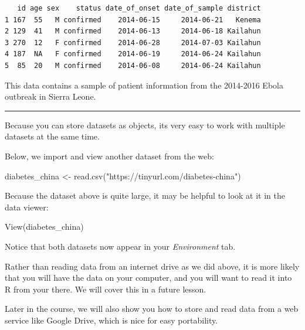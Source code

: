\documentclass[
  letterpaper,
  DIV=11,
  numbers=noendperiod]{scrreprt}
\newenvironment{Shaded}{\begin{snugshade}}{\end{snugshade}}
\newcommand{\FunctionTok}[1]{\textcolor[rgb]{0.28,0.35,0.67}{#1}}
\newcommand{\NormalTok}[1]{\textcolor[rgb]{0.00,0.23,0.31}{#1}}
\newcommand{\OtherTok}[1]{\textcolor[rgb]{0.00,0.23,0.31}{#1}}
\newcommand{\StringTok}[1]{\textcolor[rgb]{0.13,0.47,0.30}{#1}}
\begin{document}
\begin{verbatim}
   id age sex    status date_of_onset date_of_sample district
1 167  55   M confirmed    2014-06-15     2014-06-21   Kenema
2 129  41   M confirmed    2014-06-13     2014-06-18 Kailahun
3 270  12   F confirmed    2014-06-28     2014-07-03 Kailahun
4 187  NA   F confirmed    2014-06-19     2014-06-24 Kailahun
5  85  20   M confirmed    2014-06-08     2014-06-24 Kailahun
\end{verbatim}

This data contains a sample of patient information from the 2014-2016
Ebola outbreak in Sierra Leone.

\begin{center}\rule{0.5\linewidth}{0.5pt}\end{center}

Because you can store datasets as objects, its very easy to work with
multiple datasets at the same time.

Below, we import and view another dataset from the web:

\begin{Shaded}
\begin{Highlighting}[]
\NormalTok{diabetes\_china }\OtherTok{\textless{}{-}} \FunctionTok{read.csv}\NormalTok{(}\StringTok{"https://tinyurl.com/diabetes{-}china"}\NormalTok{)}
\end{Highlighting}
\end{Shaded}

Because the dataset above is quite large, it may be helpful to look at
it in the data viewer:

\begin{Shaded}
\begin{Highlighting}[]
\FunctionTok{View}\NormalTok{(diabetes\_china)}
\end{Highlighting}
\end{Shaded}

Notice that both datasets now appear in your \emph{Environment} tab.

\begin{tcolorbox}[enhanced jigsaw, titlerule=0mm, colback=white, left=2mm, breakable, opacitybacktitle=0.6, colbacktitle=quarto-callout-note-color!10!white, colframe=quarto-callout-note-color-frame, bottomtitle=1mm, opacityback=0, coltitle=black, arc=.35mm, toptitle=1mm, title=\textcolor{quarto-callout-note-color}{\faInfo}\hspace{0.5em}{Side Note}, leftrule=.75mm, toprule=.15mm, bottomrule=.15mm, rightrule=.15mm]

Rather than reading data from an internet drive as we did above, it is
more likely that you will have the data on your computer, and you will
want to read it into R from your there. We will cover this in a future
lesson.

Later in the course, we will also show you how to store and read data
from a web service like Google Drive, which is nice for easy
portability.

\end{tcolorbox}
\end{document}

